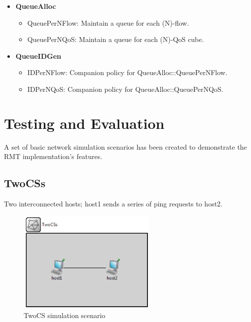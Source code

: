        \begin{itemize}
            \item \textbf{QueueAlloc}
            \begin{itemize}
                \item QueuePerNFlow: Maintain a queue for each (N)-flow.
                \item QueuePerNQoS: Maintain a queue for each (N)-QoS cube.
            \end{itemize}
            \item \textbf{QueueIDGen}
            \begin{itemize}
                \item IDPerNFlow: Companion policy for QueueAlloc::QueuePerNFlow.
                \item IDPerNQoS: Companion policy for QueueAlloc::QueuePerNQoS.
            \end{itemize}
        \end{itemize}


\chapter{Testing and Evaluation}\label{testing}

    A set of basic network simulation scenarios has been created to demonstrate the RMT implementation's features.

    \section{TwoCSs}

        Two interconnected hosts; host1 sends a series of ping requests to host2.

        \begin{figure}[H]
            \begin{center}
                \includegraphics[width=0.6\textwidth]{fig/examples-twocs.png}
              \caption{TwoCS simulation scenario}
              \label{fig:examples:twocs}
            \end{center}
        \end{figure}

